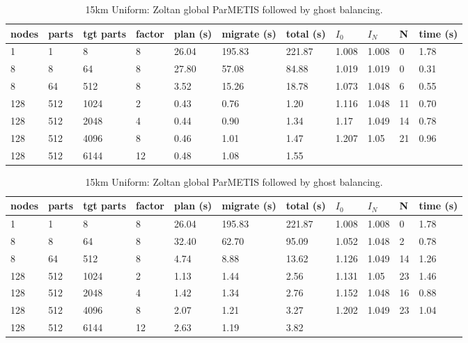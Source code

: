 \documentclass[a4paper]{article}
\begin{document}
\begin{table}
\caption{\label{tab:15kmlg}15km Uniform: Zoltan local ParMETIS followed by ghost balancing.}
\begin{tabular}{  l | l | l | l | l | l | l | l | l | l | l }
    \hline
    nodes & parts & tgt parts & factor & plan (s) & migrate (s) & total (s) & $I_0$ & $I_N$ & N & time (s) \\ \hline
    1 & 1 & 8 & 8 & 26.04 & 195.83 & 221.87 & 1.008 & 1.008 & 0 & 1.78 \\ 
    8 & 8 & 64 & 8 & 27.80 & 57.08 & 84.88 & 1.019 & 1.019 & 0 & 0.31 \\ 
    8 & 64 & 512 & 8 & 3.52 & 15.26 & 18.78 & 1.073 & 1.048 & 6 & 0.55 \\ 
    128 & 512 & 1024 & 2 & 0.43 & 0.76 & 1.20 & 1.116 & 1.048 & 11 & 0.70 \\ 
    128 & 512 & 2048 & 4 & 0.44 & 0.90 & 1.34 & 1.17 & 1.049 & 14 & 0.78 \\ 
    128 & 512 & 4096 & 8 & 0.46 & 1.01 & 1.47 & 1.207 & 1.05 & 21 & 0.96 \\ 
    128 & 512 & 6144 & 12 & 0.48 & 1.08 & 1.55 &  &  &  &  \\ 
\end{tabular}

\caption{\label{tab:15kmgg}15km Uniform: Zoltan global ParMETIS followed by ghost balancing.}
\begin{tabular}{  l | l | l | l | l | l | l | l | l | l | l }
    \hline
    nodes & parts & tgt parts & factor & plan (s) & migrate (s) & total (s) & $I_0$ & $I_N$ & N & time (s) \\ \hline
      1 & 1 & 8 & 8 & 26.04 & 195.83 & 221.87 & 1.008 & 1.008 & 0 & 1.78 \\ 
      8 & 8 & 64 & 8 & 32.40 & 62.70 & 95.09 & 1.052 & 1.048 & 2 & 0.78 \\ 
      8 & 64 & 512 & 8 & 4.74 & 8.88 & 13.62 & 1.126 & 1.049 & 14 & 1.26 \\ 
      128 & 512 & 1024 & 2 & 1.13 & 1.44 & 2.56 & 1.131 & 1.05 & 23 & 1.46 \\ 
      128 & 512 & 2048 & 4 & 1.42 & 1.34 & 2.76 & 1.152 & 1.048 & 16 & 0.88 \\ 
      128 & 512 & 4096 & 8 & 2.07 & 1.21 & 3.27 & 1.202 & 1.049 & 23 & 1.04 \\ 
      128 & 512 & 6144 & 12 & 2.63 & 1.19 & 3.82 &  &  &  & \  \\ 
\end{tabular}


\end{table}
\end{document}

